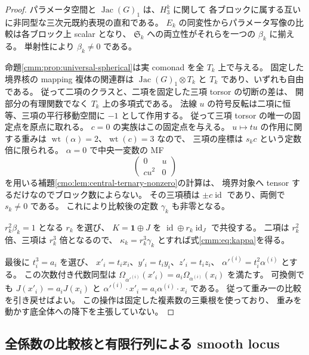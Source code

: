 \begin{proof}
パラメータ空間と $\operatorname{Jac}(G)_1$ は、$H_3^k$ に関して
各ブロックに属する互いに非同型な三次元既約表現の直和である。
$E_k$ の同変性からパラメータ写像の比較は各ブロック上 scalar となり、
$\mathfrak S_k$ への両立性がそれらを一つの $\beta_k$ に揃える。
単射性により $\beta_k\ne0$ である。

命題\ref{cmm:prop:universal-spherical}は実 comonad を全 $T_k$ 上で与える。
固定した境界核の mapping 複体の関連群は
$\operatorname{Jac}(G)_1\otimes T_k$ と $T_k$ であり、いずれも自由である。
従って二項のクラスと、二項を固定した三項 torsor の切断の差は、
開部分の有理関数でなく $T_k$ 上の多項式である。
法線 $u$ の符号反転は二項に恒等、三項の平行移動空間に $-1$ として作用する。
従って三項 torsor の唯一の固定点を原点に取れる。
$c=0$ の実族はこの固定点を与える。
$u\mapsto tu$ の作用に関する重みは
$\operatorname{wt}(\alpha)=2$、$\operatorname{wt}(c)=3$ なので、
三項の座標は $s_k c$ という定数倍に限られる。
$\alpha=0$ で中央一変数の MF
\[
 \begin{pmatrix}0&u\\cu^2&0\end{pmatrix}
\]
を用いる補題\ref{cmo:lem:central-ternary-nonzero}の計算は、
境界対象へ tensor するだけなのでブロック数によらない。
その三項積は $\pm c\operatorname{id}$ であり、両側で $s_k\ne0$ である。
これにより比較後の定数 $\gamma_k$ も非零となる。

$r_k^2\beta_k=1$ となる $r_k$ を選び、
$K=\mathbf1\oplus J$ を $\operatorname{id}\oplus r_k\operatorname{id}_J$ で共役する。
二項は $r_k^2$ 倍、三項は $r_k^3$ 倍となるので、
$\kappa_k=r_k^3\gamma_k$ とすれば式\eqref{cmm:eq:kappa}を得る。

最後に $t_i^3=a_i$ を選び、
$x'_i=t_ix_i$、$y'_i=t_iy_i$、$z'_i=t_iz_i$、
$\alpha'^{(i)}=t_i^2\alpha^{(i)}$ とする。
この次数付き代数同型は
$\Omega_{\alpha'^{(i)}}(x'_i)=a_i\Omega_{\alpha^{(i)}}(x_i)$ を満たす。
可換側でも $J(x'_i)=a_iJ(x_i)$ と
$\alpha'^{(i)}\cdot x'_i=a_i\alpha^{(i)}\cdot x_i$ である。
従って重み一の比較を引き戻せばよい。
この操作は固定した複素数の三乗根を使っており、
重みを動かす底全体への降下を主張していない。
\end{proof}

\subsection{全係数の比較核と有限行列による smooth locus}

